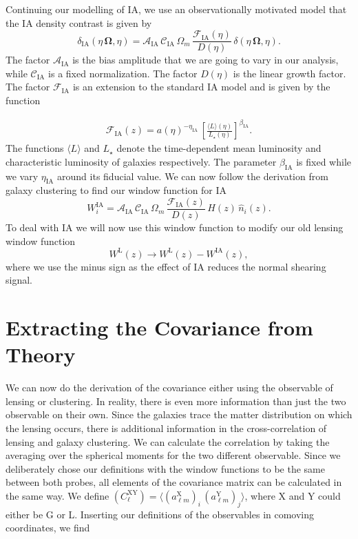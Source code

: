 \documentclass[../main.tex]{subfiles}
\begin{document}
\newline
Continuing our modelling of IA, we use an observationally motivated model that the IA density contrast is given by 
\begin{equation}
    \delta_\mathrm{IA}(\eta\,\boldsymbol{\Omega},\eta) = \mathcal{A}_\mathrm{IA}\,\mathcal{C}_\mathrm{IA}\,\Omega_m\,\frac{\mathcal{F}_\mathrm{IA}(\eta)}{D(\eta)}\,\delta(\eta\, \boldsymbol{\Omega},\eta).
\end{equation}
The factor $\mathcal{A}_\mathrm{IA}$ is the bias amplitude that we are going to vary in our analysis, while $\mathcal{C}_\mathrm{IA}$ is a fixed normalization. The factor $D(\eta)$ is the linear growth factor. The factor $\mathcal{F}_\mathrm{IA}$ is an extension to the standard IA model and is given by the function 

\begin{align}
    \mathcal{F}_\mathrm{IA}(z) = a(\eta)^{-\eta_\mathrm{IA}}\,\left[\frac{\langle L \rangle(\eta)}{L_\star(\eta)}\right]^{\beta_\mathrm{IA}}.
\end{align}
The functions $\langle L \rangle$ and $L_\star$ denote the time-dependent mean luminosity and characteristic luminosity of galaxies respectively. The parameter $\beta_\mathrm{IA}$ is fixed while we vary $\eta_\mathrm{IA}$ around its fiducial value. We can now follow the derivation from galaxy clustering to find our window function for IA\begin{equation}
    W_i^\mathrm{IA} =  \mathcal{A}_\mathrm{IA}\,\mathcal{C}_\mathrm{IA}\,\Omega_m\,\frac{\mathcal{F}_\mathrm{IA}(z)}{D(z)}\,H(z)\,\hat{n}_i(z).
\end{equation}
To deal with IA we will now use this window function to modify our old lensing window function\begin{equation}
    W^\mathrm{L}(z) \to W^\mathrm{L}(z) - W^\mathrm{IA}(z),
\end{equation}
where we use the minus sign as the effect of IA reduces the normal shearing signal.
\section{Extracting the Covariance from Theory}
We can now do the derivation of the covariance either using the observable of lensing or clustering. In reality, there is even more information than just the two observable on their own. Since the galaxies trace the matter distribution on which the lensing occurs, there is additional information in the cross-correlation of lensing and galaxy clustering. We can calculate the correlation by taking the averaging over the spherical moments for the two different observable. Since we deliberately chose our definitions with the window functions to be the same between both probes, all elements of the covariance matrix can be calculated in the same way. We define $\left(C^\mathrm{XY}_{\ell}\right)=\langle \left(a^\mathrm{X}_{\ell m}\right)_i \, \left(a^\mathrm{Y}_{\ell m}\right)_j\rangle$, where X and Y could either be G or L. Inserting our definitions of the observables in comoving coordinates, we find 
\end{document}
